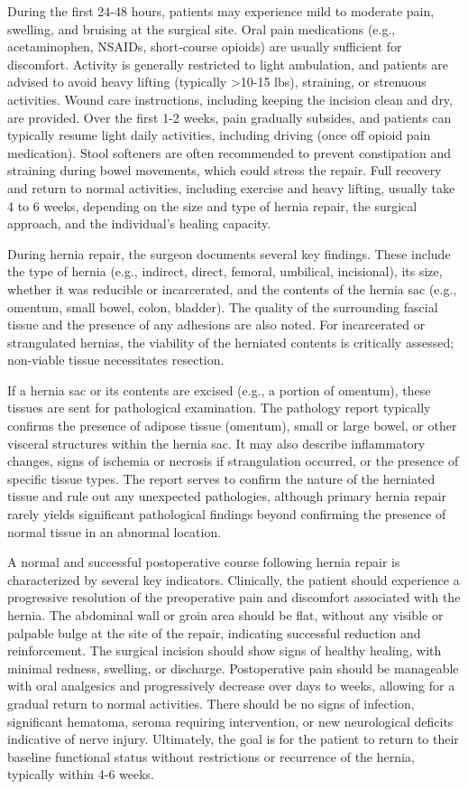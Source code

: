 During the first 24-48 hours, patients may experience mild to moderate pain, swelling, and bruising at the surgical site. Oral pain medications (e.g., acetaminophen, NSAIDs, short-course opioids) are usually sufficient for discomfort. Activity is generally restricted to light ambulation, and patients are advised to avoid heavy lifting (typically >10-15 lbs), straining, or strenuous activities. Wound care instructions, including keeping the incision clean and dry, are provided. Over the first 1-2 weeks, pain gradually subsides, and patients can typically resume light daily activities, including driving (once off opioid pain medication). Stool softeners are often recommended to prevent constipation and straining during bowel movements, which could stress the repair. Full recovery and return to normal activities, including exercise and heavy lifting, usually take 4 to 6 weeks, depending on the size and type of hernia repair, the surgical approach, and the individual's healing capacity.

During hernia repair, the surgeon documents several key findings. These include the type of hernia (e.g., indirect, direct, femoral, umbilical, incisional), its size, whether it was reducible or incarcerated, and the contents of the hernia sac (e.g., omentum, small bowel, colon, bladder). The quality of the surrounding fascial tissue and the presence of any adhesions are also noted. For incarcerated or strangulated hernias, the viability of the herniated contents is critically assessed; non-viable tissue necessitates resection.

If a hernia sac or its contents are excised (e.g., a portion of omentum), these tissues are sent for pathological examination. The pathology report typically confirms the presence of adipose tissue (omentum), small or large bowel, or other visceral structures within the hernia sac. It may also describe inflammatory changes, signs of ischemia or necrosis if strangulation occurred, or the presence of specific tissue types. The report serves to confirm the nature of the herniated tissue and rule out any unexpected pathologies, although primary hernia repair rarely yields significant pathological findings beyond confirming the presence of normal tissue in an abnormal location.

A normal and successful postoperative course following hernia repair is characterized by several key indicators. Clinically, the patient should experience a progressive resolution of the preoperative pain and discomfort associated with the hernia. The abdominal wall or groin area should be flat, without any visible or palpable bulge at the site of the repair, indicating successful reduction and reinforcement. The surgical incision should show signs of healthy healing, with minimal redness, swelling, or discharge. Postoperative pain should be manageable with oral analgesics and progressively decrease over days to weeks, allowing for a gradual return to normal activities. There should be no signs of infection, significant hematoma, seroma requiring intervention, or new neurological deficits indicative of nerve injury. Ultimately, the goal is for the patient to return to their baseline functional status without restrictions or recurrence of the hernia, typically within 4-6 weeks.

